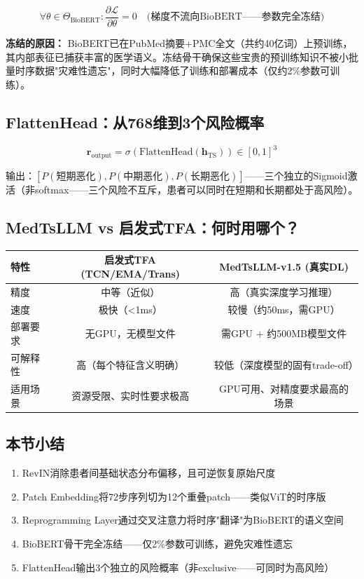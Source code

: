 \documentclass[11pt,a4paper]{ctexart}
\begin{document}
\begin{equation}
\forall \theta \in \Theta_{\text{BioBERT}}: \frac{\partial \mathcal{L}}{\partial \theta} = 0 \quad \text{(梯度不流向BioBERT——参数完全冻结)}
\end{equation}

\textbf{冻结的原因：} BioBERT已在PubMed摘要+PMC全文（共约40亿词）上预训练，其内部表征已捕获丰富的医学语义。冻结骨干确保这些宝贵的预训练知识不被小批量时序数据"灾难性遗忘"，同时大幅降低了训练和部署成本（仅约2\%参数可训练）。

\subsection{FlattenHead：从768维到3个风险概率}

$$\mathbf{r}_{\text{output}} = \sigma\left(\text{FlattenHead}(\mathbf{h}_{\text{TS}})\right) \in [0,1]^{3}$$

输出：$[P(\text{短期恶化}), P(\text{中期恶化}), P(\text{长期恶化})]$——三个独立的Sigmoid激活（非softmax——三个风险不互斥，患者可以同时在短期和长期都处于高风险）。

\subsection{MedTsLLM vs 启发式TFA：何时用哪个？}

\begin{table}[H]
\centering
\small
\begin{tabular}{lcc}
\toprule
\textbf{特性} & \textbf{启发式TFA (TCN/EMA/Trans)} & \textbf{MedTsLLM-v1.5 (真实DL)} \\
\midrule
精度 & 中等（近似） & 高（真实深度学习推理） \\
速度 & 极快（<1ms） & 较慢（约50ms，需GPU） \\
部署要求 & 无GPU，无模型文件 & 需GPU + 约500MB模型文件 \\
可解释性 & 高（每个特征含义明确） & 较低（深度模型的固有trade-off） \\
适用场景 & 资源受限、实时性要求极高 & GPU可用、对精度要求最高的场景 \\
\bottomrule
\end{tabular}
\end{table}

\subsection{本节小结}

\begin{enumerate}[nosep]
\item RevIN消除患者间基础状态分布偏移，且可逆恢复原始尺度
\item Patch Embedding将72步序列切为12个重叠patch——类似ViT的时序版
\item Reprogramming Layer通过交叉注意力将时序"翻译"为BioBERT的语义空间
\item BioBERT骨干完全冻结——仅2\%参数可训练，避免灾难性遗忘
\item FlattenHead输出3个独立的风险概率（非exclusive——可同时为高风险）
\end{enumerate}
\end{document}
